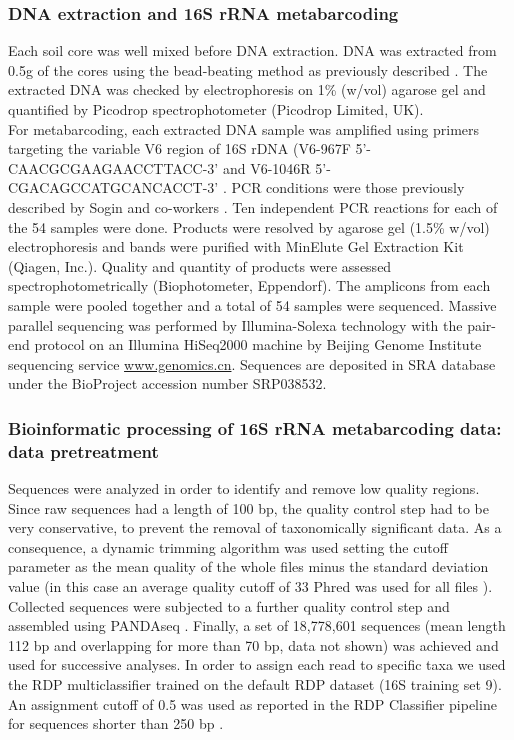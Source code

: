\subsubsection{DNA extraction and 16S rRNA metabarcoding}
Each soil core was well mixed before DNA extraction. DNA was extracted from 0.5g of the cores using the bead-beating method as previously described \cite{ascher2009sequential}. The extracted DNA was checked by electrophoresis on 1\% (w/vol) agarose gel and quantified by Picodrop spectrophotometer (Picodrop Limited, UK).\\
For metabarcoding, each extracted DNA sample was amplified using primers targeting the variable V6 region of 16S rDNA (V6-967F 5'-CAA\-CGC\-GAA\-GAA\-CCT\-TAC\-C-3' and V6-1046R 5'-CGA\-CAG\-CCA\-TGC\-ANC\-ACC\-T-3' \cite{huse2008exploring}. PCR conditions were those previously described by Sogin and co-workers \cite{sogin2006microbial}. Ten independent PCR reactions for each of the 54 samples were done. Products were resolved by agarose gel (1.5\% w/vol) electrophoresis and bands were purified with MinElute Gel Extraction Kit (Qiagen, Inc.). Quality and quantity of products were assessed spectrophotometrically (Biophotometer, Eppendorf). The amplicons from each sample were pooled together and a total of 54 samples were sequenced. Massive parallel sequencing was performed by Illumina-Solexa technology \cite{bartram2011generation,gloor2010microbiome} with the pair-end protocol on an Illumina HiSeq2000 machine by Beijing Genome Institute sequencing service \href{www.genomics.cn}{www.\-gen\-omi\-cs.cn}. Sequences are deposited in SRA database under the BioProject accession number SRP038532.\\

\subsubsection{Bioinformatic processing of 16S rRNA metabarcoding data: data pretreatment}
Sequences were analyzed in order to identify and remove low quality regions. Since raw sequences had a length of 100 bp, the quality control step had to be very conservative, to prevent the removal of taxonomically significant data. As a consequence, a dynamic trimming algorithm was used \cite{bacci2014streamingtrim} setting the cutoff parameter as the mean quality of the whole files minus the standard deviation value (in this case an average quality cutoff of 33 Phred was used for all files \cite{ewing1998base, ewing1998base}). Collected sequences were subjected to a further quality control step and assembled using PANDAseq \cite{masella2012pandaseq}. Finally, a set of 18,778,601 sequences (mean length 112 bp and overlapping for more than 70 bp, data not shown) was achieved and used for successive analyses. In order to assign each read to specific taxa we used the RDP multiclassifier trained on the default RDP dataset (16S training set 9). An assignment cutoff of 0.5 was used as reported in the RDP Classifier pipeline for sequences shorter than 250 bp \cite{wang2007naive}.\\

